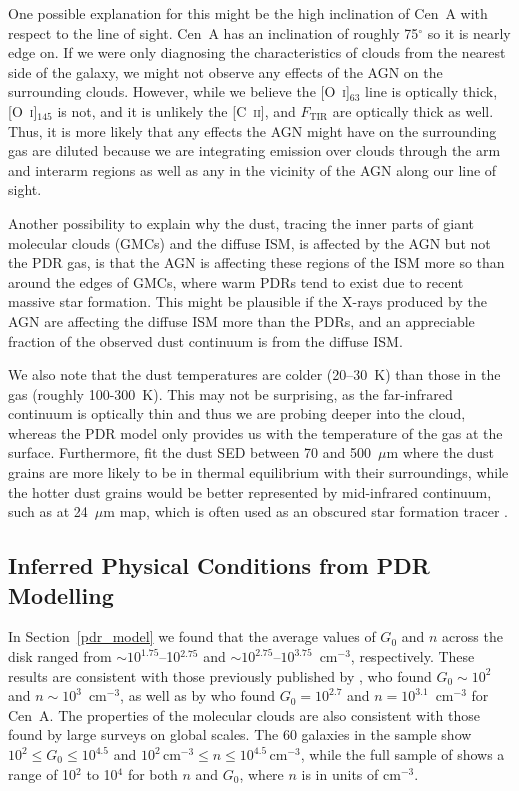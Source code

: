 \documentclass[preprint2]{aastex}
\begin{document}
One possible explanation for this might be the high inclination of Cen~A with respect to the line of sight.  Cen~A has an inclination of roughly 75$^{\circ}$ \citep{2006ApJ...645.1092Q} so it is nearly edge on.  If we were only diagnosing the characteristics of clouds from the nearest side of the galaxy, we might not observe any effects of the AGN on the surrounding clouds.  However, while we believe the [O~\textsc{i}]$_{63}$ line is optically thick, [O~\textsc{i}]$_{145}$ is not, and it is unlikely the [C~\textsc{ii}], and $F_{\mathrm{TIR}}$ are optically thick as well.  Thus, it is more likely that any effects the AGN might have on the surrounding gas are diluted because we are integrating emission over clouds through the arm and interarm regions as well as any in the vicinity of the AGN along our line of sight.

Another possibility to explain why the dust, tracing the inner parts of giant molecular clouds (GMCs) and the diffuse ISM, is affected by the AGN but not the PDR gas, is that the AGN is affecting these regions of the ISM more so than around the edges of GMCs, where warm PDRs tend to exist due to recent massive star formation.  This might be plausible if the X-rays produced by the AGN are affecting the diffuse ISM more than the PDRs, and an appreciable fraction of the observed dust continuum is from the diffuse ISM.

We also note that the dust temperatures are colder (20--30~K) than those in the gas (roughly 100-300~K).  This may not be surprising, as the far-infrared continuum is optically thin and thus we are probing deeper into the cloud, whereas the PDR model only provides us with the temperature of the gas at the surface.  Furthermore,  \citet{2012MNRAS.422.2291P} fit the dust SED between 70 and 500~$\mu$m where the dust grains are more likely to be in thermal equilibrium with their surroundings, while the hotter dust grains would be better represented by mid-infrared continuum, such as at 24~$\mu$m map, which is often used as an obscured star formation tracer \citep{2005ApJ...632L..79W, 2007ApJ...666..870C, 2010ApJ...714.1256C, 2009ApJ...703.1672K}.


\subsection{Inferred Physical Conditions from PDR Modelling}\label{discuss_pdr}
In Section~\ref{pdr_model} we found that the average values of $G_{0}$ and $n$ across the disk ranged from $\sim 10^{1.75}$--10$^{2.75}$ and $\sim 10^{2.75}$--$10^{3.75}$~cm$^{-3}$, respectively.  These results are consistent with those previously published by \citet{2000A&A...355..885U}, who found $G_{0} \sim 10^{2}$ and $n \sim 10^{3}$~cm$^{-3}$, as well as by \citet{2001A&A...375..566N} who found $G_{0} = 10^{2.7}$ and $n = 10^{3.1}$~cm$^{-3}$ for Cen~A.  The properties of the molecular clouds are also consistent with those found by large surveys on global scales.  The 60 galaxies in the \citet{2001ApJ...561..766M} sample show $10^{2} \le G_{0} \le 10^{4.5}$ and $10^{2}\,\mathrm{cm}^{-3} \le n \le 10^{4.5}\,\mathrm{cm}^{-3}$, while the full sample of \citet{2001A&A...375..566N} shows a range of 10$^{2}$ to 10$^{4}$ for both $n$ and $G_{0}$, where $n$ is in units of cm$^{-3}$.  
\end{document}
